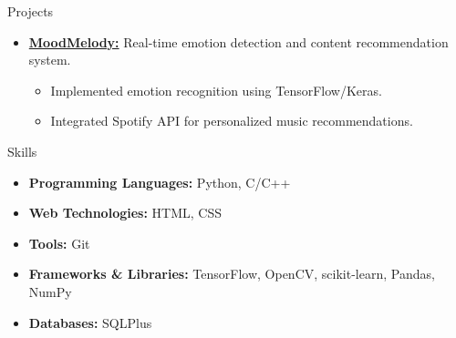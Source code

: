 \documentclass{resume} %
\begin{document}
\begin{rSection}{Projects}
\begin{itemize}
    \item{\href{https://github.com/mystichronicle/MoodMelody}{{\bf MoodMelody:}} 
    Real-time emotion detection and content recommendation system.
    \begin{itemize}
        \item Implemented emotion recognition using TensorFlow/Keras.
        \item Integrated Spotify API for personalized music recommendations.
    \end{itemize}}
\end{itemize}
\end{rSection}

\begin{rSection}{Skills}
\begin{itemize}
    \item {\bf Programming Languages:} Python, C/C++
    \item {\bf Web Technologies:} HTML, CSS
    \item {\bf Tools:} Git
    \item {\bf Frameworks \& Libraries:} TensorFlow, OpenCV, scikit-learn, Pandas, NumPy
    \item {\bf Databases:} SQLPlus
\end{itemize}
\end{rSection}
\end{document}
